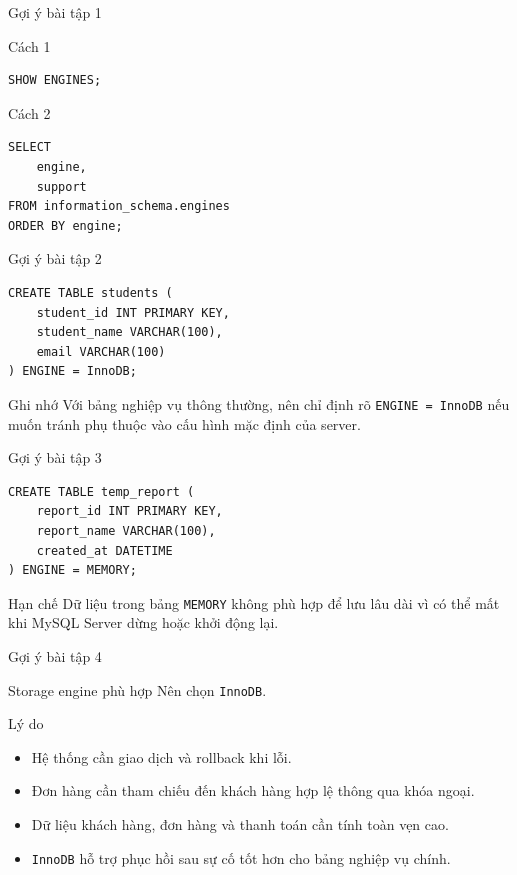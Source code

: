 \documentclass[aspectratio=169,11pt]{beamer}
\newcommand{\code}[1]{\texttt{#1}}
\newcommand{\smallitem}{\setlength{\itemsep}{2pt}}
\begin{document}
\begin{frame}[fragile]{Gợi ý bài tập 1}
\begin{block}{Cách 1}
\begin{lstlisting}
SHOW ENGINES;
\end{lstlisting}
\end{block}
\begin{block}{Cách 2}
\begin{lstlisting}
SELECT
    engine,
    support
FROM information_schema.engines
ORDER BY engine;
\end{lstlisting}
\end{block}
\end{frame}

\begin{frame}[fragile]{Gợi ý bài tập 2}
\begin{lstlisting}
CREATE TABLE students (
    student_id INT PRIMARY KEY,
    student_name VARCHAR(100),
    email VARCHAR(100)
) ENGINE = InnoDB;
\end{lstlisting}
\begin{block}{Ghi nhớ}
Với bảng nghiệp vụ thông thường, nên chỉ định rõ \code{ENGINE = InnoDB} nếu muốn tránh phụ thuộc vào cấu hình mặc định của server.
\end{block}
\end{frame}

\begin{frame}[fragile]{Gợi ý bài tập 3}
\begin{lstlisting}
CREATE TABLE temp_report (
    report_id INT PRIMARY KEY,
    report_name VARCHAR(100),
    created_at DATETIME
) ENGINE = MEMORY;
\end{lstlisting}
\begin{alertblock}{Hạn chế}
Dữ liệu trong bảng \code{MEMORY} không phù hợp để lưu lâu dài vì có thể mất khi MySQL Server dừng hoặc khởi động lại.
\end{alertblock}
\end{frame}

\begin{frame}{Gợi ý bài tập 4}
\begin{block}{Storage engine phù hợp}
Nên chọn \code{InnoDB}.
\end{block}
\begin{block}{Lý do}
\begin{itemize}\smallitem
  \item Hệ thống cần giao dịch và rollback khi lỗi.
  \item Đơn hàng cần tham chiếu đến khách hàng hợp lệ thông qua khóa ngoại.
  \item Dữ liệu khách hàng, đơn hàng và thanh toán cần tính toàn vẹn cao.
  \item \code{InnoDB} hỗ trợ phục hồi sau sự cố tốt hơn cho bảng nghiệp vụ chính.
\end{itemize}
\end{block}
\end{frame}
\end{document}
